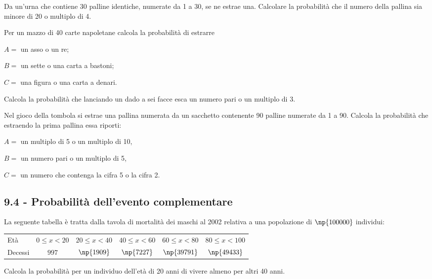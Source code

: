 \begin{esercizio}[\Ast]
 \label{ese:9.34}
Da un'urna che contiene 30 palline identiche, numerate da 1 a 30, se ne estrae una. Calcolare la probabilità che il numero della pallina sia minore di 20 o multiplo di 4.
\end{esercizio}

\begin{esercizio}
 \label{ese:9.35}
Per un mazzo di 40 carte napoletane calcola la probabilità di estrarre
\begin{description*}
\item $ A= $ un asso o un re;
\item $ B= $ un sette o una carta a bastoni;
\item $ C= $ una figura o una carta a denari.
\end{description*}
\end{esercizio}

\begin{esercizio}
 \label{ese:9.36}
Calcola la probabilità che lanciando un dado a sei facce esca un numero pari o un multiplo di 3.
\end{esercizio}

\begin{esercizio}
 \label{ese:9.37}
Nel gioco della tombola si estrae una pallina numerata da un sacchetto contenente 90 palline numerate da 1 a 90. Calcola la probabilità che estraendo la prima pallina essa riporti:
\begin{description*}
\item $ A= $ un multiplo di 5 o un multiplo di 10,
\item $ B= $ un numero pari o un multiplo di 5,
\item $ C= $ un numero che contenga la cifra 5 o la cifra 2.
\end{description*}
\end{esercizio}

\subsection*{9.4 - Probabilità dell'evento complementare}

\begin{esercizio}
 \label{ese:9.38}
La seguente tabella è tratta dalla tavola di mortalità dei maschi al 2002 relativa a una popolazione di $\np{100000}$ individui:
\begin{center}
\begin{tabular}{lccccc}
Età & $ 0\le x<20 $ &$ 20\le x<40 $ & $ 40\le x<60 $ & $ 60\le x<80 $ & $ 80\le x<100 $ \\
Decessi & $997$ & $\np{1909}$ & $\np{7227}$ & $\np{39791}$ & $\np{49433}$\\
\end{tabular}
\end{center}
Calcola la probabilità per un individuo dell'età di 20 anni di vivere almeno per altri 40 anni.
\end{esercizio}

